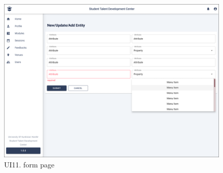 \begin{justify}
    \begin{figure}[H]
    \centerline{\includegraphics[width=150mm,scale=1]{figures/analysis_and_design/design/UI/11. Form Page (UI11).png}}
    \caption{UI11. form page}
    \label{UI11}
    \end{figure}
    \clearpage

\end{justify}
\clearpage

